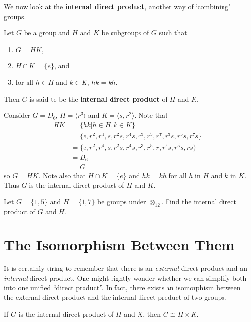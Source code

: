 We now look at the \textbf{internal direct product}, another way of `combining' groups.

\begin{definition}
    Let $G$ be a group and $H$ and $K$ be subgroups of $G$ such that
    \begin{enumerate}
        \item $G = HK$,
        \item $H \cap K = \{e\}$, and
        \item for all $h \in H$ and $k \in K$, $hk = kh$.
    \end{enumerate}
    Then $G$ is said to be the \textbf{internal direct product} of $H$ and $K$.
\end{definition}

\begin{example}
    Consider $G = D_6$, $H = \langle r^3 \rangle$ and $K = \langle s, r^2 \rangle$. Note that
    \begin{align*}
        HK &= \{hk \vert h \in H, k \in K\}\\
        &= \{e, r^2, r^4, s, r^2s, r^4s, r^3, r^5, r^7, r^3s, r^5s, r^7s\}\\
        &= \{e, r^2, r^4, s, r^2s, r^4s, r^3, r^5, r, r^3s, r^5s, rs\}\\
        &= D_6\\
        &= G
    \end{align*}
    so $G = HK$. Note also that $H \cap K = \{e\}$ and $hk = kh$ for all $h$ in $H$ and $k$ in $K$. Thus $G$ is the internal direct product of $H$ and $K$.
\end{example}

\begin{exercise}
    Let $G = \{1, 5\}$ and $H = \{1, 7\}$ be groups under $\otimes_{12}$. Find the internal direct product of $G$ and $H$.
\end{exercise}

\section{The Isomorphism Between Them}
It is certainly tiring to remember that there is an \textit{external} direct product and an \textit{internal} direct product. One might rightly wonder whether we can simplify both into one unified ``direct product''. In fact, there exists an isomorphism between the external direct product and the internal direct product of two groups.

\begin{theorem}\label{thrm-direct-product-equivilance}
    If $G$ is the internal direct product of $H$ and $K$, then $G \cong H \times K$.
\end{theorem}

